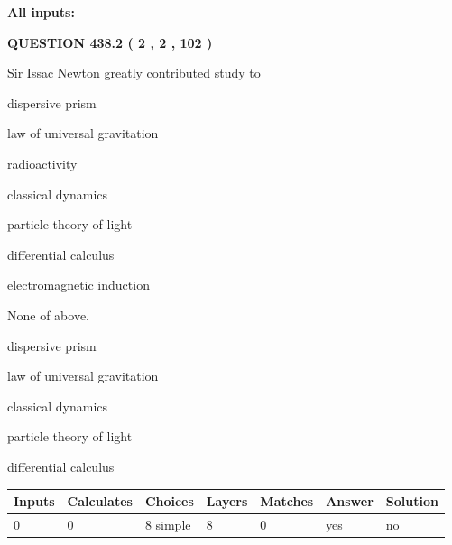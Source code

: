\documentclass[12pt]{article}
\begin{document}
   
   
   
\noindent{}
   
   
   
   
\noindent\vspace{0.1in}\hspace{-0.08in} {\textbf{\Large{All inputs: }}}
   
   
  
\vspace{0.2in}
  
{\textbf{\Large{QUESTION
438.2 
 ( 2 , 2 , 102 )
}}}
  
  
Sir Issac Newton greatly contributed study to
 
 
dispersive prism
 
 
law of universal gravitation
 
 
radioactivity
 
 
classical dynamics
 
 
particle theory of light
 
 
differential calculus
 
 
electromagnetic induction
 
 
 None of above.
 
 
\noindent{}
 
 
dispersive prism
 
 
law of universal gravitation
 
 
classical dynamics
 
 
particle theory of light
 
 
differential calculus
 
 
\noindent{}
 
 
   
   
   
   
\noindent\begin{tabular}{|l|l|l|l|l|l|l|}
 \hline
Inputs & Calculates & Choices & Layers & Matches & Answer & Solution \\ \hline
 0  & 
 0  & 
 8
  simple  
  & 
 8  & 
 0  & 
  yes & 
  no 
  \\ \hline
 \end{tabular}
   
\end{document}
